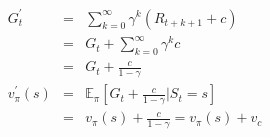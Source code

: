 \documentclass{article}
\begin{document}
\thispagestyle{empty}
\begin{eqnarray*}
G_t^\prime &=&\sum_{k=0}^{\infty} \gamma^k(R_{t+k+1}+c)\\
&=& G_t + \sum_{k=0}^{\infty} \gamma^k c \\
&=& G_t + \frac{c}{1-\gamma} \\
v_\pi^\prime(s) &=& \mathbb{E}_\pi[G_t + \frac{c}{1-\gamma} | S_t = s] \\
&=& v_\pi(s) + \frac{c}{1-\gamma} = v_\pi(s) + v_c
\end{eqnarray*}
\end{document}
